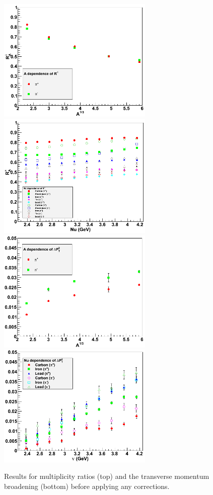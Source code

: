 \begin{figure}[htb]
\centering
\includegraphics[width=7.4cm] {chap5-fig/a_RvA.png} 
\includegraphics[width=7.4cm] {chap5-fig/a_RvZ.png} 
\includegraphics[width=7.4cm] {chap5-fig/a_PvA.png} 
\includegraphics[width=7.4cm] {chap5-fig/a_PvNu.png} 
\caption {Results for multiplicity ratios (top) and the transverse momentum 
broadening (bottom) before applying any corrections.}
\label{fig:prelim}
\end{figure}


